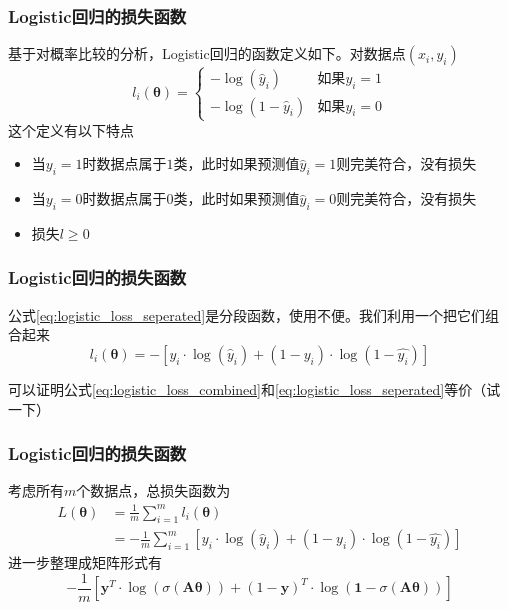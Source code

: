 \documentclass[14pt]{beamer}
\newcommand{\mat}[1]{\bm{#1}}
\renewcommand{\vec}[1]{\bm{#1}}
\newcommand{\MA}{\mat{A}}
\newcommand{\Vy}{\vec{y}}
\newcommand{\Vt}{\vec{\theta}}
\let\emph\relax %
\begin{document}
\begin{frame}
  \frametitle{Logistic回归的损失函数}
  基于对概率比较的分析，Logistic回归的函数定义如下。对\emph{某个}数据点$(x_i, y_i)$
  \begin{equation}\label{eq:logistic_loss_seperated}
    l_i(\Vt)=\left\{\begin{array}{ll}
      -\log(\hat{y}_i) & \text{如果}y_i=1\\
      -\log(1-\hat{y}_i) & \text{如果}y_i=0
    \end{array}\right.
  \end{equation}
  这个定义有以下特点
  \begin{itemize}
    \item 当$y_i=1$时数据点属于$1$类，此时如果预测值$\hat{y}_i=1$则完美符合，没有损失
    \item 当$y_i=0$时数据点属于$0$类，此时如果预测值$\hat{y}_i=0$则完美符合，没有损失
    \item 损失$l\ge0$
  \end{itemize}
\end{frame}

\begin{frame}
  \frametitle{Logistic回归的损失函数}
  公式\ref{eq:logistic_loss_seperated}是分段函数，使用不便。我们利用一个\emph{小技巧}把它们组合起来
  \begin{equation}\label{eq:logistic_loss_combined}
    l_i(\Vt)=-[y_i\cdot\log(\hat{y}_i)+(1-y_i)\cdot\log(1-\hat{y_i})]
  \end{equation}

  可以证明公式\ref{eq:logistic_loss_combined}和\ref{eq:logistic_loss_seperated}等价（试一下）

\end{frame}

\begin{frame}
  \frametitle{Logistic回归的损失函数}
  考虑所有$m$个数据点，总损失函数为
  \begin{equation*}
    \begin{split}
    L(\Vt)&=\frac{1}{m}\sum_{i=1}^m l_i(\Vt)\\
    &=-\frac{1}{m}\sum_{i=1}^m[y_i\cdot\log(\hat{y}_i)+(1-y_i)\cdot\log(1-\hat{y_i})]
    \end{split}
  \end{equation*}
  进一步整理成矩阵形式有
  \begin{equation}\label{eq:logistic_loss}
    \boxed{-\frac{1}{m}[\Vy^T\cdot\log(\sigma(\MA\Vt))+(1-\Vy)^T\cdot\log(\vec{1}-\sigma(\MA\Vt))]}
  \end{equation}
\end{frame}
\end{document}
